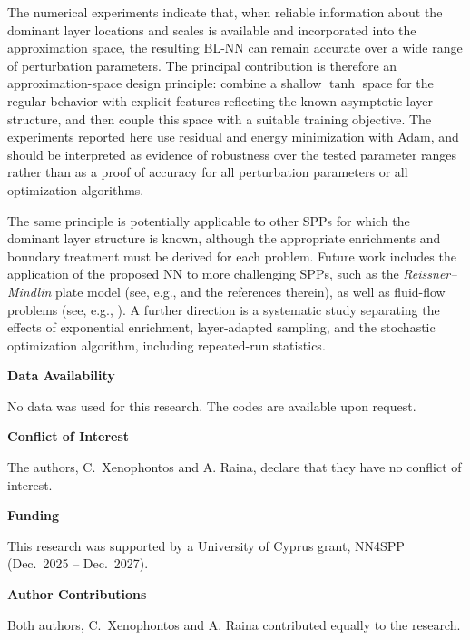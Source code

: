 \documentclass[11pt]{article}
\theoremstyle{plain}
\theoremstyle{definition}
\theoremstyle{remark}
\numberwithin{equation}{section}
\begin{document}
The numerical experiments indicate that, when reliable information about the dominant layer locations and scales is available and incorporated into the approximation space, the resulting BL-NN can remain accurate over a wide range of perturbation parameters. The principal contribution is therefore an approximation-space design principle: combine a shallow $\tanh$ space for the regular behavior with explicit features reflecting the known asymptotic layer structure, and then couple this space with a suitable training objective. The experiments reported here use residual and energy minimization with Adam, and should be interpreted as evidence of robustness over the tested parameter ranges rather than as a proof of accuracy for all perturbation parameters or all optimization algorithms.

The same principle is potentially applicable to other SPPs for which the dominant layer structure is known, although the appropriate enrichments and boundary treatment must be derived for each problem. Future work includes the application of the proposed NN to more challenging SPPs, such as the \emph{Reissner--Mindlin} plate model (see, e.g., \cite{AD} and the references therein), as well as fluid-flow problems (see, e.g., \cite{TemamSgPert}). A further direction is a systematic study separating the effects of exponential enrichment, layer-adapted sampling, and the stochastic optimization algorithm, including repeated-run statistics.

\vspace{1cm}

\noindent
\textbf{Data Availability}

\noindent
No data was used for this research. The codes are available upon request.

\vspace{0.2cm}
\noindent
\textbf{Conflict of Interest}

\noindent
The authors, C.~Xenophontos and A. Raina, declare that they have no conflict of interest.

\vspace{0.2cm}
\noindent
\textbf{Funding}

\noindent
This research was supported by a University of Cyprus grant, NN4SPP (Dec.~2025 -- Dec.~2027).


\vspace{0.2cm}
\noindent
\textbf{Author Contributions}

\noindent
Both authors, C.~Xenophontos and A. Raina contributed equally to the research.
\end{document}
